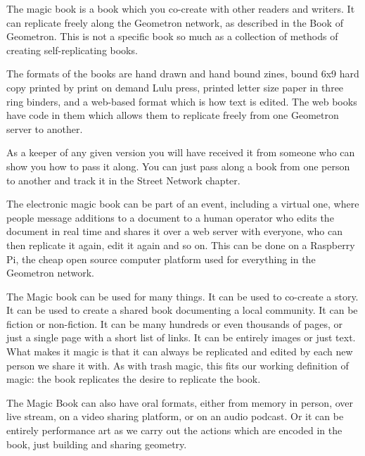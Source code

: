The magic book is a book which you co-create with other readers and writers.  It can replicate freely along the Geometron network, as described in the Book of Geometron.  This is not a specific book so much as a collection of methods of creating self-replicating books.  

The formats of the books are hand drawn and hand bound zines, bound 6x9 hard copy printed by print on demand Lulu press, printed letter size paper in three ring binders, and a web-based format which is how text is edited.  The web books have code in them which allows them to replicate freely from one Geometron server to another.  

As a keeper of any given version you will have received it from someone who can show you how to pass it along.  You can just pass along a book from one person to another and track it in the Street Network chapter. 

The electronic magic book can be part of an event, including a virtual one, where people message additions to a document to a human operator who edits the document in real time and shares it over a web server with everyone, who can then replicate it again, edit it again and so on.  This can be done on a Raspberry Pi, the cheap open source computer platform used for everything in the Geometron network. 

The Magic book can be used for many things. It can be used to co-create a story.  It can be used to create a shared book documenting a local community. It can be fiction or non-fiction.  It can be many hundreds or even thousands of pages, or just a single page with a short list of links.  It can be entirely images or just text.  What makes it magic is that it can always be replicated and edited by each new person we share it with.  As with trash magic, this fits our working definition of magic: the book replicates the desire to replicate the book.  

The Magic Book can also have oral formats, either from memory in person, over live stream, on a video sharing platform, or on an audio podcast.  Or it can be entirely performance art as we carry out the actions which are encoded in the book, just building and sharing geometry. 
